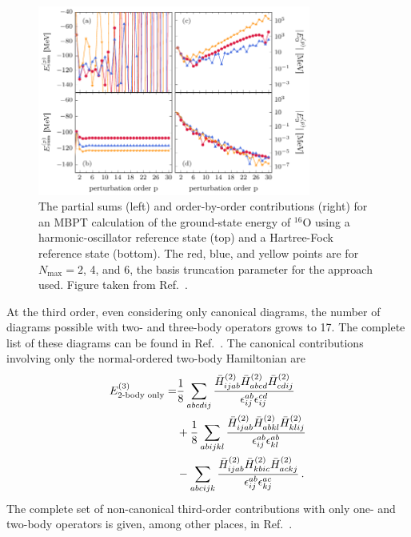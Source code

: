 \begin{figure}[t!]
  \centering
  \includegraphics[width=0.8\textwidth]{proposal/doc/images/external/ho_vs_hf_mbpt.pdf}
  \caption[
    The partial sums (left) and order-by-order contributions (right)
    for an MBPT calculation of the ground-state energy of ${}^{16}\text{O}$
    using a harmonic-oscillator reference state (top)
    and a Hartree-Fock reference state (bottom).
    The red, blue, and yellow points are for $N_{\text{max}}=2$, 4, and 6,
    the basis truncation parameter for the approach used.
  ]{
    The partial sums (left) and order-by-order contributions (right)
    for an MBPT calculation of the ground-state energy of ${}^{16}\text{O}$
    using a harmonic-oscillator reference state (top)
    and a Hartree-Fock reference state (bottom).
    The red, blue, and yellow points are for $N_{\text{max}}=2$, 4, and 6,
    the basis truncation parameter for the approach used.
    Figure taken from Ref.~\cite{Tich16hohfmbpt}.
  }\label{fig:ho_vs_hf_mbpt}
\end{figure}

At the third order, even considering only canonical diagrams,
the number of diagrams possible with two- and three-body operators grows to 17.
The complete list of these diagrams can be found in Ref.~\cite{Hu18mbptthreebody}.
The canonical contributions involving only the normal-ordered two-body Hamiltonian are
\begin{equation}
  \begin{split}
  E^{(3)}_{\text{2-body only}} =
    &\frac{1}{8} \sum_{abcdij} \frac{{\bar{H}}^{(2)}_{ijab} {\bar{H}}^{(2)}_{abcd}{\bar{H}}^{(2)}_{cdij}}{\epsilon_{ij}^{ab}\epsilon_{ij}^{cd}} \\
    &+ \frac{1}{8} \sum_{abijkl} \frac{{\bar{H}}^{(2)}_{ijab} {\bar{H}}^{(2)}_{abkl}{\bar{H}}^{(2)}_{klij}}{\epsilon_{ij}^{ab}\epsilon_{kl}^{ab}} \\
    &- \sum_{abcijk} \frac{{\bar{H}}^{(2)}_{ijab} {\bar{H}}^{(2)}_{kbic}{\bar{H}}^{(2)}_{ackj}}{\epsilon_{ij}^{ab}\epsilon_{kj}^{ac}}\,.
  \end{split}
\end{equation}
The complete set of non-canonical third-order contributions
with only one- and two-body operators
is given, among other places, in Ref.~\cite{Tich17phd}.

